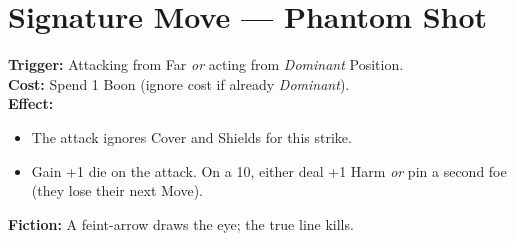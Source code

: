 \documentclass[11pt]{article}
\begin{document}
\section*{Signature Move --- Phantom Shot}
\textbf{Trigger:} Attacking from Far \emph{or} acting from \emph{Dominant} Position.\\
\textbf{Cost:} Spend 1 Boon (ignore cost if already \emph{Dominant}).\\
\textbf{Effect:}
\begin{itemize}
  \item The attack ignores Cover and Shields for this strike.
  \item Gain +1 die on the attack. On a 10, either deal +1 Harm \emph{or} pin a second foe (they lose their next Move).
\end{itemize}
\textbf{Fiction:} A feint-arrow draws the eye; the true line kills.
\end{document}
